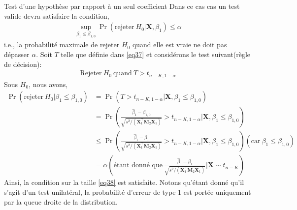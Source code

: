 \begin{frame}[allowframebreaks]{Test d'une hypothèse par rapport à un seul coefficient}
\medskip
 Dans ce cas cas un test valide devra satisfaire la condition,
\begin{align}
\underset{\beta_1\leq\beta_{1,0}}{\sup}\Pr(\textrm{rejeter} \ H_0 | \mathbf{X}, \beta_1) \leq \alpha
\label{eq38}
\end{align}
i.e., la probabilité maximale de rejeter $H_0$ quand elle est vraie ne doit pas dépasser $\alpha$. Soit $T$ telle que définie dans \eqref{eq37} et considérons le test suivant(règle de décision):
\begin{align*}
\textrm{Rejeter}  \ H_0 \ \textrm{quand}  \ T > t_{n-K, 1-\alpha}
\end{align*}
Sous $H_0$, nous avons,
\begin{align*}
\Pr\left(\textrm{rejeter} \ H_0 | \beta_1 \leq \beta_{1,0}  \right)&=\Pr\left(T >  t_{n-K, 1-\alpha} | \mathbf{X}, \beta_1 \leq \beta_{1,0}\right)\\
&=\Pr\left( 
\frac{\widehat{\beta}_1 - \beta_{1,0}}{\sqrt{s^2/(\mathbf{X}_1^\top\mathbf{M}_2\mathbf{X}_1)}} >  t_{n-K, 1-\alpha} | \mathbf{X}, \beta_1 \leq \beta_{1,0}\right)\\
&\leq
\Pr\left( 
\frac{\widehat{\beta}_1 - \beta_1}{\sqrt{s^2/(\mathbf{X}_1^\top\mathbf{M}_2\mathbf{X}_1)}} >  t_{n-K, 1-\alpha} | \mathbf{X}, \beta_1 \leq \beta_{1,0}\right)(\textrm{car}  \  \beta_1 \leq \beta_{1,0})\\
&=\alpha( \textrm{étant donné que} \  \frac{\widehat{\beta}_1 - \beta_1}{\sqrt{s^2/(\mathbf{X}_1^\top\mathbf{M}_2\mathbf{X}_1)}} | \mathbf{X} \sim t_{n-K}  )
\end{align*}
Ainsi, la condition sur la taille \eqref{eq38} est satisfaite. Notons qu'étant donné qu'il s'agit d'un test unilatéral, la probabilité d'erreur de type 1 est portée uniquement par la queue droite de la distribution.
\end{frame}


